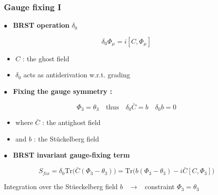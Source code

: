 \documentclass[9pt]{beamer}
\begin{document}
\begin{frame}

\frametitle{Gauge fixing I}

\vfill

$\bullet$ \ \textbf{BRST operation} $\delta_0$

\begin{equation*}
\delta_0 \Phi_\mu = i [C,\Phi_\mu]
\end{equation*}

\begin{itemize}
\item $C$ : the ghost field

\item $\delta_0$ acts as antiderivation w.r.t. grading
\end{itemize}

\vfill

$\bullet$ \ \textbf{Fixing the gauge symmetry :}

\begin{equation*}
\Phi_3=\theta_3 \quad \mbox{thus} \quad \delta_0 {\bar{C}} = b \quad \delta_0b = 0
\end{equation*}

\begin{itemize}
\item where ${\bar{C}}$ : the antighost field
\item and $b$ : the St\"uckelberg field
\end{itemize}

\vfill

$\bullet$ \ \textbf{BRST invariant gauge-fixing term}

\begin{equation*}
S_{fix}=\delta_0\mbox{Tr}\big({\bar{C}}(\Phi_3-\theta_3) \big)=\mbox{Tr}\big(b(\Phi_3-\theta_3)-i{\bar{C}}[C,\Phi_3]\big)
\end{equation*}

Integration over the St\"ueckelberg field $b$ \ $\to$ \ constraint $\Phi_3=\theta_3$

\vfill

\end{frame}

\end{document}
